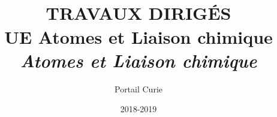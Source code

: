 \documentclass[12pt,french,dvips]{report}
\title{{\Huge \textbf{      \\ 
TRAVAUX DIRIG\'ES  \\[1.5cm] 
UE Atomes et Liaison chimique\\
\textsl{Atomes et Liaison chimique}}}\\[3cm]
\vspace{2cm}}
\author{Portail Curie}
\date{2018-2019}
\begin{document}

\newcommand{\secd}{\alpha - \varepsilon_i}
\newcommand{\bulletd}{\small \begin{tabular}{c} $\bullet$ \\[-0.3cm] $\bullet$ \\ \end{tabular}}

\newcommand{\bra}{\left\langle}
\newcommand{\ket}{\right\rangle}

\pagestyle{empty}
\maketitle

\cleardoublepage


\pagestyle{plain}
\tableofcontents

\cleardoublepage




%
%
%





\cleardoublepage

\pagestyle{empty}



%
%
\end{document}
